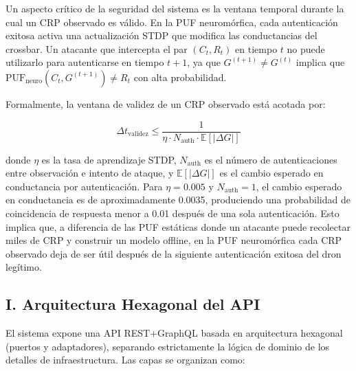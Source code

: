 Un aspecto crítico de la seguridad del sistema es la ventana temporal durante la cual un CRP observado es válido. En la PUF neuromórfica, cada autenticación exitosa activa una actualización STDP que modifica las conductancias del crossbar. Un atacante que intercepta el par $(C_t, R_t)$ en tiempo $t$ no puede utilizarlo para autenticarse en tiempo $t+1$, ya que $G^{(t+1)} \neq G^{(t)}$ implica que $\text{PUF}_{\text{neuro}}(C_t, G^{(t+1)}) \neq R_t$ con alta probabilidad.

Formalmente, la ventana de validez de un CRP observado está acotada por:

\begin{equation}
    \Delta t_{\text{validez}} \leq \frac{1}{\eta \cdot N_{\text{auth}} \cdot \mathbb{E}[|\Delta G|]}
    \label{eq:window}
\end{equation}

donde $\eta$ es la tasa de aprendizaje STDP, $N_{\text{auth}}$ es el número de autenticaciones entre observación e intento de ataque, y $\mathbb{E}[|\Delta G|]$ es el cambio esperado en conductancia por autenticación. Para $\eta = 0.005$ y $N_{\text{auth}} = 1$, el cambio esperado en conductancia es de aproximadamente 0.0035, produciendo una probabilidad de coincidencia de respuesta menor a 0.01 después de una sola autenticación. Esto implica que, a diferencia de las PUF estáticas donde un atacante puede recolectar miles de CRP y construir un modelo offline, en la PUF neuromórfica cada CRP observado deja de ser útil después de la siguiente autenticación exitosa del dron legítimo.

\subsection*{I. Arquitectura Hexagonal del API}

El sistema expone una API REST+GraphQL basada en arquitectura hexagonal (puertos y adaptadores), separando estrictamente la lógica de dominio de los detalles de infraestructura. Las capas se organizan como:


